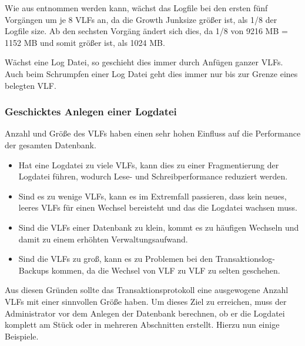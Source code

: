           Wie aus  entnommen werden kann, wächst das
          Logfile bei den ersten fünf Vorgängen um je 8 VLFs an, da die
          Growth Junksize größer ist, als 1/8 der Logfile size. Ab den
          sechsten Vorgäng ändert sich dies, da 1/8 von 9216 MB = 1152 MB und
          somit größer ist, als 1024 MB.          
          \begin{merke}
            Wächst eine Log Datei, so geschieht dies immer durch Anfügen ganzer
            VLFs. Auch beim Schrumpfen einer Log Datei geht dies immer nur bis zur
            Grenze eines belegten VLF.
          \end{merke}
\clearpage
          \begin{literaturinternet}
            \item \cite{ms179355}
            \item \cite{KLTTLIctVcaiSS}
          \end{literaturinternet}
        \subsubsection{Geschicktes Anlegen einer Logdatei}
          Anzahl und Größe des VLFs haben einen sehr hohen Einfluss auf die
          Performance der gesamten Datenbank.
          \begin{itemize}
              \item Hat eine Logdatei zu viele VLFs, kann dies zu einer
              Fragmentierung der Logdatei führen, wodurch Lese- und
              Schreibperformance reduziert werden.
              \item Sind es zu wenige VLFs, kann es im Extremfall passieren,
              dass kein neues, leeres VLFs für einen Wechsel bereisteht und
              das die Logdatei wachsen muss.
              \item Sind die VLFs einer Datenbank zu klein, kommt es zu häufigen
              Wechseln und damit zu einem erhöhten Verwaltungsaufwand.
              \item Sind die VLFs zu groß, kann es zu Problemen bei den
              Transaktionslog-Backups kommen, da die Wechsel von VLF zu VLF zu
              selten geschehen.
          \end{itemize} 
          Aus diesen Gründen sollte das Transaktionsprotokoll eine ausgewogene
          Anzahl VLFs mit einer sinnvollen Größe haben. Um dieses Ziel zu
          erreichen, muss der Administrator vor dem Anlegen der Datenbank
          berechnen, ob er die Logdatei komplett am Stück oder in mehreren
          Abschnitten erstellt. Hierzu nun einige Beispiele.
          
